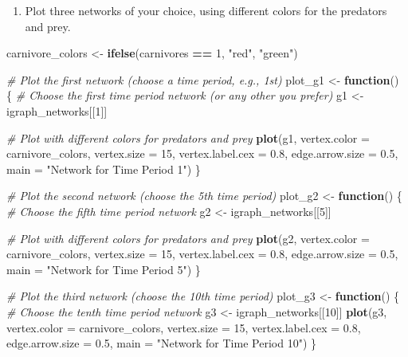 \documentclass[
]{article}
\newenvironment{Shaded}{\begin{snugshade}}{\end{snugshade}}
\newcommand{\AttributeTok}[1]{\textcolor[rgb]{0.13,0.29,0.53}{#1}}
\newcommand{\CommentTok}[1]{\textcolor[rgb]{0.56,0.35,0.01}{\textit{#1}}}
\newcommand{\ControlFlowTok}[1]{\textcolor[rgb]{0.13,0.29,0.53}{\textbf{#1}}}
\newcommand{\DecValTok}[1]{\textcolor[rgb]{0.00,0.00,0.81}{#1}}
\newcommand{\FloatTok}[1]{\textcolor[rgb]{0.00,0.00,0.81}{#1}}
\newcommand{\FunctionTok}[1]{\textcolor[rgb]{0.13,0.29,0.53}{\textbf{#1}}}
\newcommand{\NormalTok}[1]{#1}
\newcommand{\OtherTok}[1]{\textcolor[rgb]{0.56,0.35,0.01}{#1}}
\newcommand{\SpecialCharTok}[1]{\textcolor[rgb]{0.81,0.36,0.00}{\textbf{#1}}}
\newcommand{\StringTok}[1]{\textcolor[rgb]{0.31,0.60,0.02}{#1}}
\providecommand{\tightlist}{%
  \setlength{\itemsep}{0pt}\setlength{\parskip}{0pt}}
\begin{document}
\begin{enumerate}
\def\labelenumi{\alph{enumi}.}
\setcounter{enumi}{1}
\tightlist
\item
  Plot three networks of your choice, using different colors for the
  predators and prey.
\end{enumerate}

\begin{Shaded}
\begin{Highlighting}[]
\NormalTok{carnivore\_colors }\OtherTok{\textless{}{-}} \FunctionTok{ifelse}\NormalTok{(carnivores }\SpecialCharTok{==} \DecValTok{1}\NormalTok{, }\StringTok{"red"}\NormalTok{, }\StringTok{"green"}\NormalTok{)}

\CommentTok{\# Plot the first network (choose a time period, e.g., 1st)}
\NormalTok{plot\_g1 }\OtherTok{\textless{}{-}} \ControlFlowTok{function}\NormalTok{() \{}
  \CommentTok{\# Choose the first time period network (or any other you prefer)}
\NormalTok{  g1 }\OtherTok{\textless{}{-}}\NormalTok{ igraph\_networks[[}\DecValTok{1}\NormalTok{]]}
  
  \CommentTok{\# Plot with different colors for predators and prey}
  \FunctionTok{plot}\NormalTok{(g1, }
       \AttributeTok{vertex.color =}\NormalTok{ carnivore\_colors, }
       \AttributeTok{vertex.size =} \DecValTok{15}\NormalTok{, }
       \AttributeTok{vertex.label.cex =} \FloatTok{0.8}\NormalTok{, }
       \AttributeTok{edge.arrow.size =} \FloatTok{0.5}\NormalTok{, }
       \AttributeTok{main =} \StringTok{"Network for Time Period 1"}\NormalTok{)}
\NormalTok{\}}

\CommentTok{\# Plot the second network (choose the 5th time period)}
\NormalTok{plot\_g2 }\OtherTok{\textless{}{-}} \ControlFlowTok{function}\NormalTok{() \{}
  \CommentTok{\# Choose the fifth time period network}
\NormalTok{  g2 }\OtherTok{\textless{}{-}}\NormalTok{ igraph\_networks[[}\DecValTok{5}\NormalTok{]]}
  
  \CommentTok{\# Plot with different colors for predators and prey}
  \FunctionTok{plot}\NormalTok{(g2, }
       \AttributeTok{vertex.color =}\NormalTok{ carnivore\_colors, }
       \AttributeTok{vertex.size =} \DecValTok{15}\NormalTok{, }
       \AttributeTok{vertex.label.cex =} \FloatTok{0.8}\NormalTok{, }
       \AttributeTok{edge.arrow.size =} \FloatTok{0.5}\NormalTok{, }
       \AttributeTok{main =} \StringTok{"Network for Time Period 5"}\NormalTok{)}
\NormalTok{\}}

\CommentTok{\# Plot the third network (choose the 10th time period)}
\NormalTok{plot\_g3 }\OtherTok{\textless{}{-}} \ControlFlowTok{function}\NormalTok{() \{}
  \CommentTok{\# Choose the tenth time period network}
\NormalTok{  g3 }\OtherTok{\textless{}{-}}\NormalTok{ igraph\_networks[[}\DecValTok{10}\NormalTok{]]}
  \FunctionTok{plot}\NormalTok{(g3, }
       \AttributeTok{vertex.color =}\NormalTok{ carnivore\_colors, }
       \AttributeTok{vertex.size =} \DecValTok{15}\NormalTok{, }
       \AttributeTok{vertex.label.cex =} \FloatTok{0.8}\NormalTok{, }
       \AttributeTok{edge.arrow.size =} \FloatTok{0.5}\NormalTok{, }
       \AttributeTok{main =} \StringTok{"Network for Time Period 10"}\NormalTok{)}
\NormalTok{\}}


\end{Highlighting}
\end{Shaded}
\end{document}
